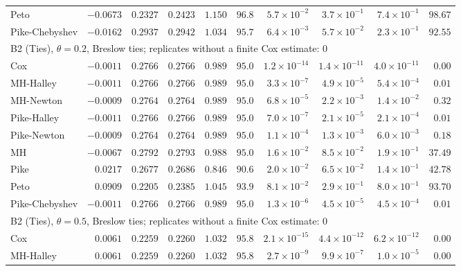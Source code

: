 \begin{landscape}
\begin{longtable}{lrrrrrrrrr}
Peto & $-0.0673$ & $0.2327$ & $0.2423$ & $1.150$ & $96.8$ & $5.7 \times 10^{-2}$ & $3.7 \times 10^{-1}$ & $7.4 \times 10^{-1}$ & $98.67$ \\
Pike-Chebyshev & $-0.0162$ & $0.2937$ & $0.2942$ & $1.034$ & $95.7$ & $6.4 \times 10^{-3}$ & $5.7 \times 10^{-2}$ & $2.3 \times 10^{-1}$ & $92.55$ \\
\multicolumn{10}{l}{B2 (Ties), $\theta = 0.2$, Breslow ties; replicates without a finite Cox estimate: 0} \\
Cox & $-0.0011$ & $0.2766$ & $0.2766$ & $0.989$ & $95.0$ & $1.2 \times 10^{-14}$ & $1.4 \times 10^{-11}$ & $4.0 \times 10^{-11}$ & $0.00$ \\
MH-Halley & $-0.0011$ & $0.2766$ & $0.2766$ & $0.989$ & $95.0$ & $3.3 \times 10^{-7}$ & $4.9 \times 10^{-5}$ & $5.4 \times 10^{-4}$ & $0.01$ \\
MH-Newton & $-0.0009$ & $0.2764$ & $0.2764$ & $0.989$ & $95.0$ & $6.8 \times 10^{-5}$ & $2.2 \times 10^{-3}$ & $1.4 \times 10^{-2}$ & $0.32$ \\
Pike-Halley & $-0.0011$ & $0.2766$ & $0.2766$ & $0.989$ & $95.0$ & $7.0 \times 10^{-7}$ & $2.1 \times 10^{-5}$ & $2.1 \times 10^{-4}$ & $0.01$ \\
Pike-Newton & $-0.0009$ & $0.2764$ & $0.2764$ & $0.989$ & $95.0$ & $1.1 \times 10^{-4}$ & $1.3 \times 10^{-3}$ & $6.0 \times 10^{-3}$ & $0.18$ \\
MH & $-0.0067$ & $0.2792$ & $0.2793$ & $0.988$ & $95.0$ & $1.6 \times 10^{-2}$ & $8.5 \times 10^{-2}$ & $1.9 \times 10^{-1}$ & $37.49$ \\
Pike & $0.0217$ & $0.2677$ & $0.2686$ & $0.846$ & $90.6$ & $2.0 \times 10^{-2}$ & $6.5 \times 10^{-2}$ & $1.4 \times 10^{-1}$ & $42.78$ \\
Peto & $0.0909$ & $0.2205$ & $0.2385$ & $1.045$ & $93.9$ & $8.1 \times 10^{-2}$ & $2.9 \times 10^{-1}$ & $8.0 \times 10^{-1}$ & $93.70$ \\
Pike-Chebyshev & $-0.0011$ & $0.2766$ & $0.2766$ & $0.989$ & $95.0$ & $1.3 \times 10^{-6}$ & $4.5 \times 10^{-5}$ & $4.5 \times 10^{-4}$ & $0.01$ \\
\multicolumn{10}{l}{B2 (Ties), $\theta = 0.5$, Breslow ties; replicates without a finite Cox estimate: 0} \\
Cox & $0.0061$ & $0.2259$ & $0.2260$ & $1.032$ & $95.8$ & $2.1 \times 10^{-15}$ & $4.4 \times 10^{-12}$ & $6.2 \times 10^{-12}$ & $0.00$ \\
MH-Halley & $0.0061$ & $0.2259$ & $0.2260$ & $1.032$ & $95.8$ & $2.7 \times 10^{-9}$ & $9.9 \times 10^{-7}$ & $1.0 \times 10^{-5}$ & $0.00$ \\

\end{longtable}
\end{landscape}
